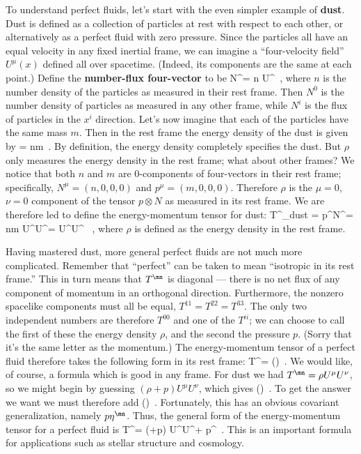 \documentclass[12pt]{article}
\begin{document}
To understand perfect fluids, let's start with the even simpler example 
of {\bf dust}.  Dust is defined as a collection of particles at rest
with respect to each other, or alternatively as a perfect fluid with
zero pressure.  Since the particles all have an equal velocity in
any fixed inertial frame, we can imagine a ``four-velocity field''
$U^\mu(x)$ defined all over spacetime.  (Indeed, its components are
the same at each point.)  Define the {\bf number-flux four-vector}
to be
\be
  N^\mu = n U^\mu\ ,\label{1.104}
\ee
where $n$ is the number density of the particles as measured in their
rest frame.  Then $N^0$ is the number density of particles as measured
in any other frame, while $N^i$ is the flux of particles in the $x^i$
direction.  Let's now imagine that each of the particles have the same
mass $m$.  Then in the rest frame the energy density of the dust is
given by
\be
  \rho = nm\ .\label{1.105}
\ee
By definition, the energy density completely specifies the dust.  But
$\rho$ only measures the energy density in the rest frame; what about
other frames?  We notice that both $n$ and $m$ are $0$-components of
four-vectors in their rest frame; specifically, $N^\mu = (n,0,0,0)$
and $p^\mu = (m,0,0,0)$.  Therefore $\rho$ is the $\mu = 0$, 
$\nu =0$ component of the tensor $p\otimes N$ as measured in its
rest frame.  We are therefore led to define the energy-momentum tensor
for dust:
\be
  T^\mn_{\rm dust} = p^\mu N^\nu = nm U^\mu U^\nu = \rho U^\mu U^\nu
  \ ,\label{1.106}
\ee
where $\rho$ is defined as the energy density in the rest frame.

Having mastered dust, more general perfect fluids are not much more
complicated.  Remember that ``perfect'' can be taken to mean
``isotropic in its rest frame.''  This in turn means that $T^\mn$
is diagonal --- there is no net flux of any component of momentum
in an orthogonal direction.  Furthermore, the nonzero spacelike 
components must all be equal, $T^{11} = T^{22}=T^{33}$.  The only
two independent numbers are therefore $T^{00}$ and one of the
$T^{ii}$; we can choose to call the first of these the energy density
$\rho$, and the second the pressure $p$.  (Sorry that it's the same
letter as the momentum.)  The energy-momentum tensor of a perfect
fluid therefore takes the following form in its rest frame:
\be
  T^\mn = \left(\right)\ .\label{1.107}
\ee
We would like, of course, a formula which is good in any frame.
For dust we had $T^\mn = \rho U^\mu U^\nu$, so we might begin by
guessing $(\rho+p)U^\mu U^\nu$, which gives
\be
  \left(\right)\ .\label{1.108}
\ee
To get the answer we want we must therefore add
\be
  \left(\right)\ .\label{1.109}
\ee
Fortunately, this has an obvious covariant generalization, namely
$p\eta^\mn$.  Thus, the general form of the energy-momentum 
tensor for a perfect fluid is
\be
  T^\mn = (\rho+p) U^\mu U^\nu + p\eta^\mn\ .\label{1.110}
\ee
This is an important formula for applications such as stellar
structure and cosmology.
\end{document}
